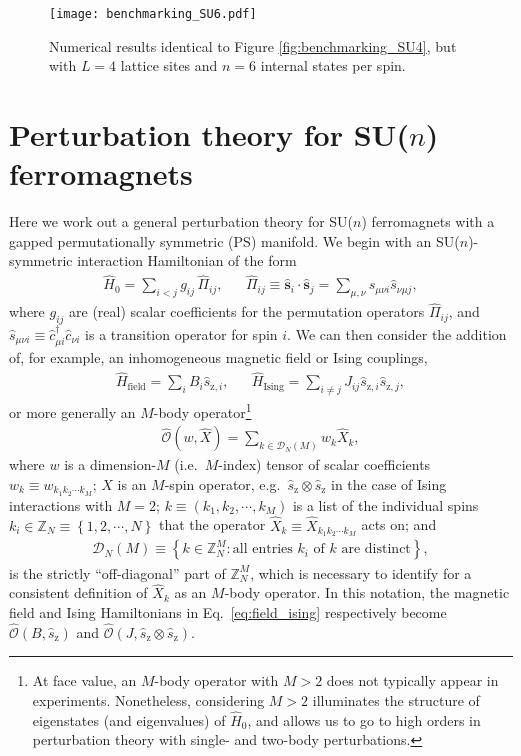 \documentclass[aps,pra,nofootinbib,twocolumn,superscriptaddress]{revtex4-2}
\renewcommand{\t}{\text} %
\newcommand{\p}[1]{\left(#1\right)} %
\renewcommand{\set}[1]{\left\{#1\right\}} %
\newcommand{\1}{\mathds{1}}
\renewcommand{\c}{\hat{c}}
\newcommand{\s}{\hat{s}}
\renewcommand{\H}{\hat{H}}
\renewcommand{\O}{\hat{\mathcal{O}}}
\newcommand{\z}{\text{z}}
\newcommand{\ZZ}{\mathbb{Z}}
\newcommand{\D}{\mathcal{D}}
\begin{document}
\begin{figure}[h]
\centering
\texttt{[image: benchmarking\_SU6.pdf]}
\caption{
Numerical results identical to Figure \ref{fig:benchmarking_SU4}, but with $L=4$ lattice sites and $n=6$ internal states per spin.
}
\label{fig:benchmarking_SU6}
\end{figure}

\section{Perturbation theory for SU($n$) ferromagnets}
\label{sec:pert_theory}

Here we work out a general perturbation theory for SU($n$) ferromagnets with a gapped permutationally symmetric (PS) manifold.
We begin with an SU($n$)-symmetric interaction Hamiltonian of the form
\begin{align}
  \H_0 = \sum_{i<j} g_{ij} \, \hat\Pi_{ij},
  &&
  \hat\Pi_{ij} \equiv \bm\s_i\cdot\bm\s_j
  = \sum_{\mu,\nu} \s_{\mu\nu i} \s_{\nu\mu j},
  \label{eq:H_0}
\end{align}
where $g_{ij}$ are (real) scalar coefficients for the permutation operators $\hat\Pi_{ij}$, and $\s_{\mu\nu i}\equiv \c_{\mu i}^\dag \c_{\nu i}$ is a transition operator for spin $i$.
We can then consider the addition of, for example, an inhomogeneous magnetic field or Ising couplings,
\begin{align}
  \H_{\t{field}} = \sum_i B_i \s_{\z,i},
  &&
  \H_{\t{Ising}} = \sum_{i\ne j} J_{ij} \s_{\z,i} \s_{\z,j},
  \label{eq:field_ising}
\end{align}
or more generally an $M$-body operator\footnote{
At face value, an $M$-body operator with $M>2$ does not typically appear in experiments.
Nonetheless, considering $M>2$ illuminates the structure of eigenstates (and eigenvalues) of $\H_0$, and allows us to go to high orders in perturbation theory with single- and two-body perturbations.
}
\begin{align}
  \O(w,\hat{X}) = \sum_{k\in\D_N\p{M}} w_k \hat{X}_k,
\end{align}
where $w$ is a dimension-$M$ (i.e.~$M$-index) tensor of scalar
coefficients $w_k\equiv w_{k_1k_2\cdots k_M}$; $X$ is an $M$-spin
operator, e.g.~$\s_\z\otimes \s_\z$ in the case of Ising interactions
with $M=2$; $k\equiv\p{k_1,k_2,\cdots,k_M}$ is a list of the
individual spins $k_i\in\ZZ_N\equiv\set{1,2,\cdots,N}$ that the operator $\hat{X}_k\equiv \hat{X}_{k_1k_2\cdots k_M}$ acts on; and
\begin{align}
  \D_N\p{M} \equiv
  \set{ k \in \ZZ_N^M : \t{all entries $k_i$ of $k$ are distinct} },
\end{align}
is the strictly ``off-diagonal'' part of $\ZZ_N^M$, which is necessary to identify for a consistent definition of $\hat{X}_k$ as an $M$-body operator.
In this notation, the magnetic field and Ising Hamiltonians in Eq.~\eqref{eq:field_ising} respectively become $\O\p{B,\s_\z}$ and $\O\p{J,\s_\z\otimes \s_\z}$.
\end{document}
